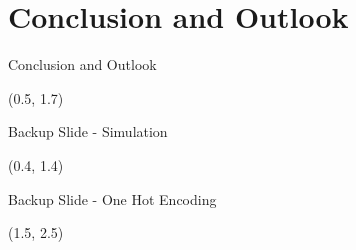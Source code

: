 \documentclass[english,aspectratio=169,dvipsnames]{beamer}
\begin{document}
\section{Conclusion and Outlook}

\begin{frame}{Conclusion and Outlook}
    \begin{textblock}{5}(0.5, 1.7)
        
    \end{textblock}
\end{frame}

\appendix

\begin{frame}{Backup Slide - Simulation}
    \begin{textblock}{5}(0.4, 1.4)
        
    \end{textblock}
\end{frame}

\begin{frame}{Backup Slide - One Hot Encoding}
    \begin{textblock}{5}(1.5, 2.5)
        
    \end{textblock}
\end{frame}
\end{document}
